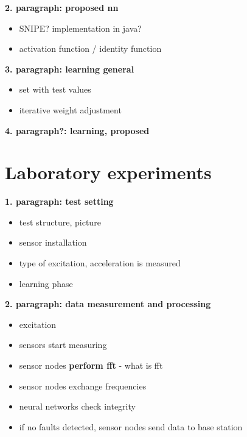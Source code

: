 \documentclass[12pt]{scrartcl}
\begin{document}

\textbf{2. paragraph: proposed nn}

\begin{itemize}
\item SNIPE? implementation in java?
\item activation function / identity function
\end{itemize}

\textbf{3. paragraph: learning general}

\begin{itemize}
\item set with test values
\item iterative weight adjustment
\end{itemize}

\textbf{4. paragraph?: learning, proposed}



\newpage
\section*{Laboratory experiments}

\textbf{1. paragraph: test setting}

\begin{itemize}
\item test structure, picture
\item sensor installation
\item type of excitation, acceleration is measured

\item learning phase
\end{itemize}

\textbf{2. paragraph: data measurement and processing}

\begin{itemize}
\item excitation
\item sensors start measuring
\item sensor nodes \textbf{perform fft} - what is fft
\item sensor nodes exchange frequencies
\item neural networks check integrity
\item if no faults detected, sensor nodes send data to base station
\end{itemize}
\end{document}
